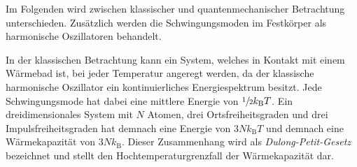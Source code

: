     Im Folgenden wird zwischen klassischer und quantenmechanischer Betrachtung unterschieden.
    Zusätzlich werden die Schwingungsmoden im Festkörper als harmonische Oszillatoren behandelt.

    In der klassischen Betrachtung kann ein System,
    welches in Kontakt mit einem Wärmebad ist,
    bei jeder Temperatur angeregt werden,
    da der klassische harmonische Oszillator ein kontinuierliches Energiespektrum besitzt.
    Jede Schwingungsmode hat dabei eine mittlere Energie von $\sfrac{1}{2} k_\text{B} T$.
    Ein dreidimensionales System mit $N$ Atomen,
    drei Ortsfreiheitsgraden und drei Impulsfreiheitsgraden hat demnach eine Energie von $3Nk_\text{B}T$ und demnach eine Wärmekapazität von $3Nk_\text{B}$.
    Dieser Zusammenhang wird als \textit{Dulong-Petit-Gesetz} bezeichnet und stellt den Hochtemperaturgrenzfall der Wärmekapazität dar.













































